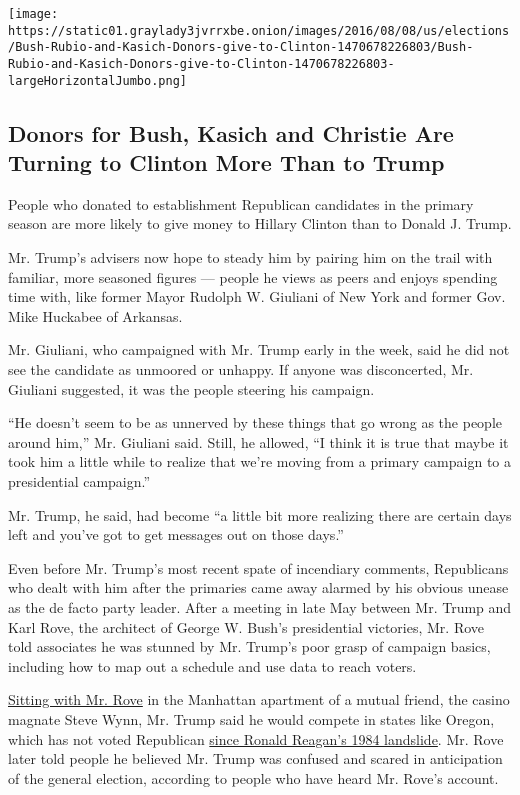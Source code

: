 \texttt{[image: https://static01.graylady3jvrrxbe.onion/images/2016/08/08/us/elections/Bush-Rubio-and-Kasich-Donors-give-to-Clinton-1470678226803/Bush-Rubio-and-Kasich-Donors-give-to-Clinton-1470678226803-largeHorizontalJumbo.png]}

\hypertarget{donors-for-bush-kasich-and-christie-are-turning-to-clinton-more-than-to-trump}{%
\subsection{Donors for Bush, Kasich and Christie Are Turning to Clinton
More Than to
Trump}\label{donors-for-bush-kasich-and-christie-are-turning-to-clinton-more-than-to-trump}}

People who donated to establishment Republican candidates in the primary
season are more likely to give money to Hillary Clinton than to Donald
J. Trump.

Mr. Trump's advisers now hope to steady him by pairing him on the trail
with familiar, more seasoned figures --- people he views as peers and
enjoys spending time with, like former Mayor Rudolph W. Giuliani of New
York and former Gov. Mike Huckabee of Arkansas.

Mr. Giuliani, who campaigned with Mr. Trump early in the week, said he
did not see the candidate as unmoored or unhappy. If anyone was
disconcerted, Mr. Giuliani suggested, it was the people steering his
campaign.

``He doesn't seem to be as unnerved by these things that go wrong as the
people around him,'' Mr. Giuliani said. Still, he allowed, ``I think it
is true that maybe it took him a little while to realize that we're
moving from a primary campaign to a presidential campaign.''

Mr. Trump, he said, had become ``a little bit more realizing there are
certain days left and you've got to get messages out on those days.''

Even before Mr. Trump's most recent spate of incendiary comments,
Republicans who dealt with him after the primaries came away alarmed by
his obvious unease as the de facto party leader. After a meeting in late
May between Mr. Trump and Karl Rove, the architect of George W. Bush's
presidential victories, Mr. Rove told associates he was stunned by Mr.
Trump's poor grasp of campaign basics, including how to map out a
schedule and use data to reach voters.

\href{http://www.nytimes3xbfgragh.onion/2016/06/03/us/politics/karl-rove-donald-trump.html}{Sitting
with Mr. Rove} in the Manhattan apartment of a mutual friend, the casino
magnate Steve Wynn, Mr. Trump said he would compete in states like
Oregon, which has not voted Republican
\href{http://www.270towin.com/states/Oregon}{since Ronald Reagan's 1984
landslide}. Mr. Rove later told people he believed Mr. Trump was
confused and scared in anticipation of the general election, according
to people who have heard Mr. Rove's account.

